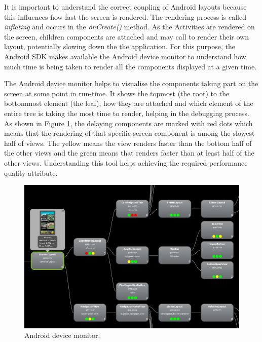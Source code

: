 It is important to understand the correct coupling of Android layouts because this influences how fast the screen is rendered. The rendering process is called \textit{inflating} and occurs in the \textit{onCreate()} method. As the Activities are rendered on the screen, children components are attached and may call to render their own layout, potentially slowing down the the application. For this purpose, the Android SDK makes available the Android device monitor to understand how much time is being taken to render all the components displayed at a given time. 

The Android device monitor helps to visualise the components taking part on the screen at some point in run-time. It shows  the topmost (the root) to the bottommost element (the leaf), how they are attached and which element of the entire tree is taking the most time to render, helping in the debugging process. As shown in Figure \ref{fig:android_device_monitor}, the delaying components are marked with red dots which means that the rendering of that specific screen component is among the slowest half of views. The yellow means the view renders faster than the bottom half of the other views and the green means that renders faster than at least half of the other views. Understanding this tool helps achieving the required performance quality attribute. 

\begin{figure}[H]
\begin{adjustbox}{width=1\textwidth,center=\textwidth}
  \centering
  \includegraphics[scale=1]{images/android_device_monitor_2.png}
\end{adjustbox}
  \caption[Android device monitor]{Android device monitor.}
  \label{fig:android_device_monitor}
\end{figure}

